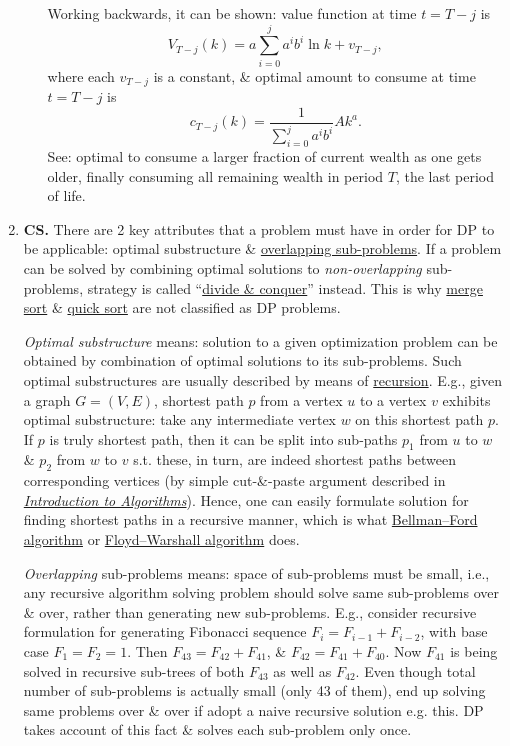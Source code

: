 \documentclass{article}
\begin{document}
\begin{enumerate}
\begin{itemize}
		Working backwards, it can be shown: value function at time $t = T - j$ is
		\begin{equation*}
			V_{T-j}(k) = a\sum_{i=0}^j a^ib^i\ln k + v_{T-j},
		\end{equation*}
		where each $v_{T-j}$ is a constant, \& optimal amount to consume at time $t = T - j$ is
		\begin{equation*}
			c_{T-j}(k) = \frac{1}{\sum_{i=0}^j a^ib^i}Ak^a.
		\end{equation*}
		See: optimal to consume a larger fraction of current wealth as one gets older, finally consuming all remaining wealth in period $T$, the last period of life.
	\end{itemize}
	\item {\bf CS.} There are 2 key attributes that a problem must have in order for DP to be applicable: optimal substructure \& \href{https://en.wikipedia.org/wiki/Overlapping_subproblem}{overlapping sub-problems}. If a problem can be solved by combining optimal solutions to {\it non-overlapping} sub-problems, strategy is called ``\href{https://en.wikipedia.org/wiki/Divide_and_conquer_algorithm}{divide \& conquer}'' instead. This is why \href{https://en.wikipedia.org/wiki/Mergesort}{merge sort} \& \href{https://en.wikipedia.org/wiki/Quicksort}{quick sort} are not classified as DP problems.
	
	{\it Optimal substructure} means: solution to a given optimization problem can be obtained by combination of optimal solutions to its sub-problems. Such optimal substructures are usually described by means of \href{https://en.wikipedia.org/wiki/Recursion}{recursion}. E.g., given a graph $G = (V,E)$, shortest path $p$ from a vertex $u$ to a vertex $v$ exhibits optimal substructure: take any intermediate vertex $w$ on this shortest path $p$. If $p$ is truly shortest path, then it can be split into sub-paths $p_1$ from $u$ to $w$ \& $p_2$ from $w$ to $v$ s.t. these, in turn, are indeed shortest paths between corresponding vertices (by simple cut-\&-paste argument described in \href{https://en.wikipedia.org/wiki/Introduction_to_Algorithms}{\it Introduction to Algorithms}). Hence, one can easily formulate solution for finding shortest paths in a recursive manner, which is what \href{https://en.wikipedia.org/wiki/Bellman%E2%80%93Ford_algorithm}{Bellman--Ford algorithm} or \href{https://en.wikipedia.org/wiki/Floyd%E2%80%93Warshall_algorithm}{Floyd--Warshall algorithm} does.
	
	{\it Overlapping} sub-problems means: space of sub-problems must be small, i.e., any recursive algorithm solving problem should solve same sub-problems over \& over, rather than generating new sub-problems. E.g., consider recursive formulation for generating Fibonacci sequence $F_i = F_{i-1} + F_{i-2}$, with base case $F_1 = F_2 = 1$. Then $F_{43} = F_{42} + F_{41}$, \& $F_{42} = F_{41} + F_{40}$. Now $F_{41}$ is being solved in recursive sub-trees of both $F_{43}$ as well as $F_{42}$. Even though total number of sub-problems is actually small (only 43 of them), end up solving same problems over \& over if adopt a naive recursive solution e.g. this. DP takes account of this fact \& solves each sub-problem only once.
	

\end{enumerate}
\end{document}
